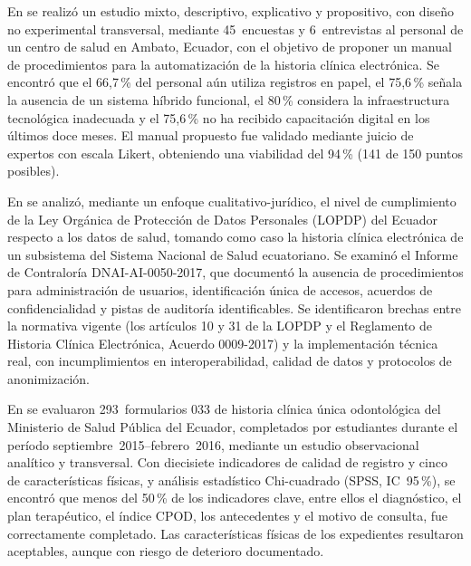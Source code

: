 En \cite{laraespinoza2026gestion} se realizó un estudio mixto, descriptivo,
explicativo y propositivo, con diseño no experimental transversal, mediante
45~encuestas y 6~entrevistas al personal de un centro de salud en Ambato, Ecuador,
con el objetivo de proponer un manual de procedimientos para la automatización de la
historia clínica electrónica. Se encontró que el 66{,}7\,\% del personal aún utiliza
registros en papel, el 75{,}6\,\% señala la ausencia de un sistema híbrido funcional,
el 80\,\% considera la infraestructura tecnológica inadecuada y el 75{,}6\,\% no ha
recibido capacitación digital en los últimos doce meses. El manual propuesto fue
validado mediante juicio de expertos con escala Likert, obteniendo una viabilidad del
94\,\% (141 de 150 puntos posibles).

En \cite{martinez2022proteccion} se analizó, mediante un enfoque cualitativo-jurídico,
el nivel de cumplimiento de la Ley Orgánica de Protección de Datos Personales (LOPDP)
del Ecuador respecto a los datos de salud, tomando como caso la historia clínica
electrónica de un subsistema del Sistema Nacional de Salud ecuatoriano. Se examinó el
Informe de Contraloría DNAI-AI-0050-2017, que documentó la ausencia de procedimientos
para administración de usuarios, identificación única de accesos, acuerdos de
confidencialidad y pistas de auditoría identificables. Se identificaron brechas entre
la normativa vigente (los artículos 10 y 31 de la LOPDP y el Reglamento de Historia
Clínica Electrónica, Acuerdo 0009-2017) y la implementación técnica real, con incumplimientos en interoperabilidad, calidad de
datos y protocolos de anonimización.

En \cite{uce2016caracteristicas} se evaluaron 293~formularios 033 de historia clínica
única odontológica del Ministerio de Salud Pública del Ecuador, completados por
estudiantes durante el período septiembre~2015--febrero~2016, mediante un estudio
observacional analítico y transversal. Con diecisiete indicadores de calidad de
registro y cinco de características físicas, y análisis estadístico Chi-cuadrado
(SPSS, IC~95\,\%), se encontró que menos del 50\,\% de los indicadores clave,
entre ellos el diagnóstico, el plan terapéutico, el índice CPOD, los antecedentes y
el motivo de consulta, fue correctamente completado. Las características físicas de los expedientes
resultaron aceptables, aunque con riesgo de deterioro documentado.